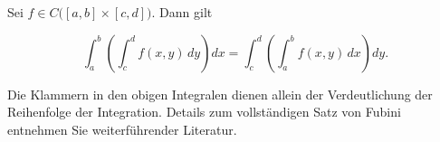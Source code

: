 \begin{satz}{}
Sei \(f\in C\bigl([a,b]\times[c,d]\bigr)\). Dann gilt


\[
\int_a^b\left(\int_c^d f(x,y)\,dy\right)dx = \int_c^d\left(\int_a^b f(x,y)\,dx\right)dy.
\]


\end{satz}

\begin{bemerkungbox}
Die Klammern in den obigen Integralen dienen allein der Verdeutlichung der Reihenfolge der Integration. Details zum vollständigen Satz von Fubini entnehmen Sie weiterführender Literatur.
\end{bemerkungbox}


